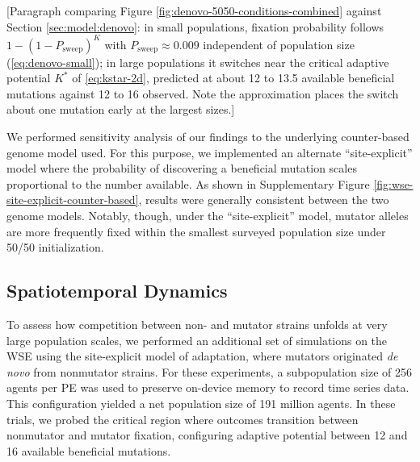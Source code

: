 [Paragraph comparing Figure \ref{fig:denovo-5050-conditions-combined} against Section \ref{sec:model:denovo}: in small populations, fixation probability follows $1 - (1 - P_\mathrm{sweep})^K$ with $P_\mathrm{sweep} \approx 0.009$ independent of population size (\cref{eq:denovo-small}); in large populations it switches near the critical adaptive potential $K^*$ of \cref{eq:kstar-2d}, predicted at about 12 to 13.5 available beneficial mutations against 12 to 16 observed. Note the approximation places the switch about one mutation early at the largest sizes.]

We performed sensitivity analysis of our findings to the underlying counter-based genome model used.
For this purpose, we implemented an alternate ``site-explicit'' model where the probability of discovering a beneficial mutation scales proportional to the number available.
As shown in Supplementary Figure \ref{fig:wse-site-explicit-counter-based}, results were generally consistent between the two genome models.
Notably, though, under the ``site-explicit'' model, mutator alleles are more frequently fixed within the smallest surveyed population size under 50/50 initialization.

\subsection{Spatiotemporal Dynamics}
\label{sec:dynamics}

To assess how competition between non- and mutator strains unfolds at very large population scales, we performed an additional set of simulations on the WSE using the site-explicit model of adaptation, where mutators originated \textit{de novo} from nonmutator strains.
For these experiments, a subpopulation size of 256 agents per PE was used to preserve on-device memory to record time series data.
This configuration yielded a net population size of 191 million agents.
In these trials, we probed the critical region where outcomes transition between nonmutator and mutator fixation, configuring adaptive potential between 12 and 16 available beneficial mutations.



